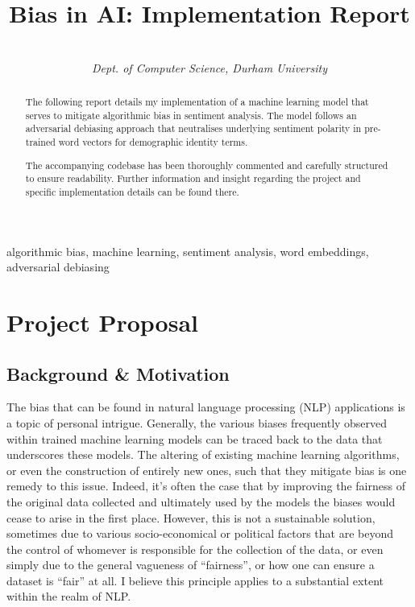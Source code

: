 \documentclass[a4paper]{IEEEtran}
\begin{document}
\title{Bias in AI: Implementation Report \vspace{-0.2em}}

\author{\\ \textit{Dept. of Computer Science, Durham University}\vspace{-2em}}

\maketitle

\begin{abstract}
The following report details my implementation of a machine learning model that serves to mitigate algorithmic bias in sentiment analysis. The model follows an adversarial debiasing approach that neutralises underlying sentiment polarity in pre-trained word vectors for demographic identity terms.

The accompanying codebase has been thoroughly commented and carefully structured to ensure readability. Further information and insight regarding the project and specific implementation details can be found there.
\end{abstract}

\begin{IEEEkeywords}
algorithmic bias, machine learning, sentiment analysis, word embeddings, adversarial debiasing
\end{IEEEkeywords}

\section{Project Proposal}

\subsection{Background \& Motivation}

The bias that can be found in natural language processing (NLP) applications is a topic of personal intrigue. Generally, the various biases frequently observed within trained machine learning models can be traced back to the data that underscores these models. The altering of existing machine learning algorithms, or even the construction of entirely new ones, such that they mitigate bias is one remedy to this issue. Indeed, it's often the case that by improving the fairness of the original data collected and ultimately used by the models the biases would cease to arise in the first place. However, this is not a sustainable solution, sometimes due to various socio-economical or political factors that are beyond the control of whomever is responsible for the collection of the data, or even simply due to the general vagueness of ``fairness'', or how one can ensure a dataset is ``fair'' at all. I believe this principle applies to a substantial extent within the realm of NLP. 
\end{document}
